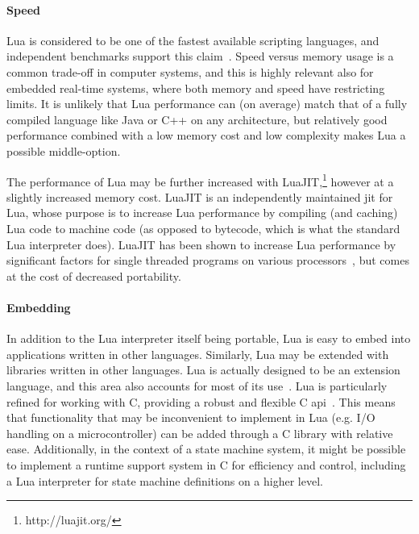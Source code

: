 \paragraph{Speed}
Lua is considered to be one of the fastest available scripting languages, and independent benchmarks support this claim~\cite{website:computer_language_benchmarks_game}. Speed versus memory usage is a common trade-off in computer systems, and this is highly relevant also for embedded real-time systems, where both memory and speed have restricting limits. It is unlikely that Lua performance can (on average) match that of a fully compiled language like Java or C++ on any architecture, but relatively good performance combined with a low memory cost and low complexity makes Lua a possible middle-option.

The performance of Lua may be further increased with LuaJIT,\footnote{http://luajit.org/} however at a slightly increased memory cost. LuaJIT is an independently maintained \gls{jit} for Lua, whose purpose is to increase Lua performance by compiling (and caching) Lua code to machine code (as opposed to bytecode, which is what the standard Lua interpreter does). LuaJIT has been shown to increase Lua performance by significant factors for single threaded programs on various processors~\cite{website:luajit_performance}, but comes at the cost of decreased portability.

\paragraph{Embedding}
In addition to the Lua interpreter itself being portable, Lua is easy to embed into applications written in other languages. Similarly, Lua may be extended with libraries written in other languages. Lua is actually designed to be an extension language, and this area also accounts for most of its use~\cite{website:where_lua_is_used}. Lua is particularly refined for working with C, providing a robust and flexible C \gls{api}~\cite[Ch.24]{book:programming_in_lua_first}. This means that functionality that may be inconvenient to implement in Lua (e.g. I/O handling on a microcontroller) can be added through a C library with relative ease. Additionally, in the context of a state machine system, it might be possible to implement a runtime support system in C for efficiency and control, including a Lua interpreter for state machine definitions on a higher level.

